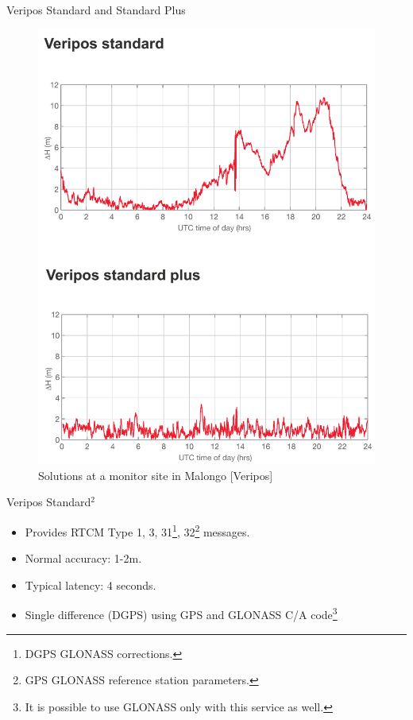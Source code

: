 \documentclass[11pt]{beamer}
\begin{document}
\begin{frame}{Veripos Standard and Standard Plus}
	\begin{figure}
		\includegraphics[height=0.8\textheight]{pic/StdPlus.png}
		\caption{Solutions at a monitor site in Malongo [Veripos]}
	\end{figure}
	
\end{frame}


\begin{frame}{Veripos Standard$^2$}
	
	\begin{itemize}	
		\item Provides RTCM Type 1, 3, 31\footnote{DGPS GLONASS corrections.}, 32\footnote{GPS GLONASS reference station parameters.} messages.
		\item Normal accuracy: 1-2m. 
		\item Typical latency: 4 seconds.
		\item Single difference (DGPS) using GPS and GLONASS C/A code\footnote[frame]{It is possible to use GLONASS only with this service as well.}
	\end{itemize}	
	
\end{frame}
\end{document}
